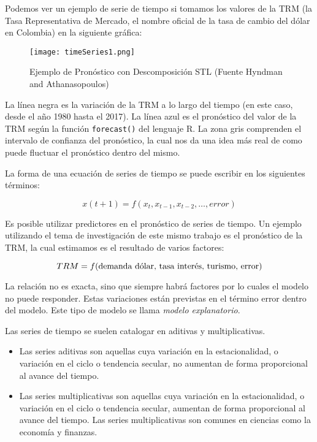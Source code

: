 Podemos ver un ejemplo de serie de tiempo si tomamos los valores de la TRM (la Tasa Representativa de Mercado, el nombre oficial de la tasa de cambio del dólar en Colombia) en la siguiente gráfica:

\begin{figure}[h]
    \centering
    \texttt{[image: timeSeries1.png]}
    \caption{Ejemplo de Pronóstico con Descomposición STL (Fuente Hyndman and Athanasopoulos)}
\end{figure}

La línea negra es la variación de la TRM a lo largo del tiempo (en este caso, desde el año 1980 hasta el 2017). La línea azul es el pronóstico del valor de la TRM según la función \texttt{forecast()} del lenguaje R. La zona gris comprenden el intervalo de confianza del pronóstico, la cual nos da una idea más real de como puede fluctuar el pronóstico dentro del mismo.

La forma de una ecuación de series de tiempo se puede escribir en los siguientes términos:

\[ x(t+1) = f(x_t, x_{t-1}, x_{t-2}, \ldots, error) \]

Es posible utilizar predictores en el pronóstico de series de tiempo. Un ejemplo utilizando el tema de investigación de este mismo trabajo es el pronóstico de la TRM, la cual estimamos es el resultado de varios factores:

\[ TRM = f(\textnormal{demanda dólar, tasa interés, turismo, error}) \]

La relación no es exacta, sino que siempre habrá factores por lo cuales el modelo no puede responder. Estas variaciones están previstas en el término error dentro del modelo. Este tipo de modelo se llama \emph{modelo explanatorio}.

Las series de tiempo se suelen catalogar en aditivas y multiplicativas.

\begin{itemize}
	\item Las series aditivas son aquellas cuya variación en la estacionalidad, o variación en el ciclo o tendencia secular, no aumentan de forma proporcional al avance del tiempo.
	\item Las series multiplicativas son aquellas cuya variación en la estacionalidad, o variación en el ciclo o tendencia secular, aumentan de forma proporcional al avance del tiempo. Las series multiplicativas son comunes en ciencias como la economía y finanzas.
\end{itemize}

